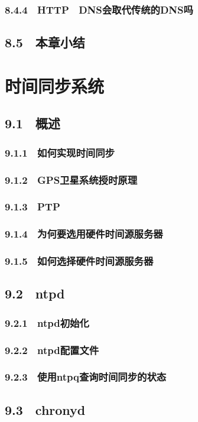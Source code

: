 \documentclass[12pt,UTF8]{ctexbook}
\begin{document}
{\subsection{8.4.4　HTTP　DNS会取代传统的DNS吗}
\section{8.5　本章小结}
\chapter{时间同步系统}
\section{9.1　概述}
\subsection{9.1.1　如何实现时间同步}
\subsection{9.1.2　GPS卫星系统授时原理}
\subsection{9.1.3　PTP}
\subsection{9.1.4　为何要选用硬件时间源服务器}
\subsection{9.1.5　如何选择硬件时间源服务器}
\section{9.2　ntpd}
\subsection{9.2.1　ntpd初始化}
\subsection{9.2.2　ntpd配置文件}
\subsection{9.2.3　使用ntpq查询时间同步的状态}
\section{9.3　chronyd}
}
\end{document}
